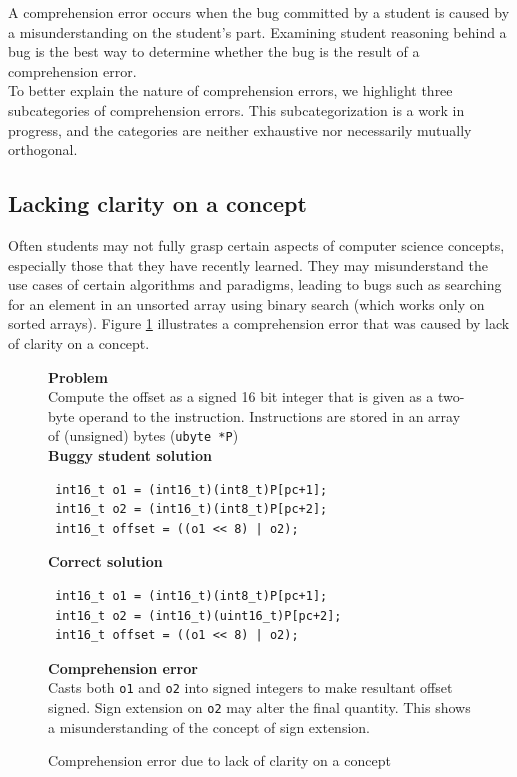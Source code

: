 \documentclass{sig-alternate}
\begin{document}
A comprehension error occurs when the bug committed by a student is caused by a misunderstanding on the student's part. Examining student reasoning behind a bug is the best way to determine whether the bug is the result of a comprehension error.\\

To better explain the nature of comprehension errors, we highlight three subcategories of comprehension errors. This subcategorization is a work in progress, and the categories are neither exhaustive nor necessarily mutually orthogonal.

\subsection{Lacking clarity on a concept}
\label{sec:comp1}
Often students may not fully grasp certain aspects of computer science concepts, especially those that they have recently learned. They may misunderstand the use cases of certain algorithms and paradigms, leading to bugs such as searching for an element in an unsorted array using binary search (which works only on sorted arrays). Figure \ref{fig:comp1} illustrates a comprehension error that was caused by lack of clarity on a concept.

\begin{figure}
\begin{framed}
\setlength{\parindent}{0cm}

\textbf{Problem}\\
Compute the offset as a signed 16 bit integer that is given as a two-byte operand	to the instruction. Instructions are stored in an array of (unsigned) bytes (\verb|ubyte *P|) \\

\textbf{Buggy student solution}
\begin{verbatim}
 int16_t o1 = (int16_t)(int8_t)P[pc+1];
 int16_t o2 = (int16_t)(int8_t)P[pc+2];
 int16_t offset = ((o1 << 8) | o2);
\end{verbatim}

\textbf{Correct solution}
\begin{verbatim}
 int16_t o1 = (int16_t)(int8_t)P[pc+1];
 int16_t o2 = (int16_t)(uint16_t)P[pc+2];
 int16_t offset = ((o1 << 8) | o2);
\end{verbatim}

\textbf{Comprehension error}\\
Casts both \verb|o1| and \verb|o2| into signed integers to make resultant offset signed. Sign extension on \verb|o2| may alter the final quantity. This shows a misunderstanding of the concept of sign extension.

\end{framed}
\caption{Comprehension error due to lack of clarity on a concept}
\label{fig:comp1}
\end{figure}
\end{document}
